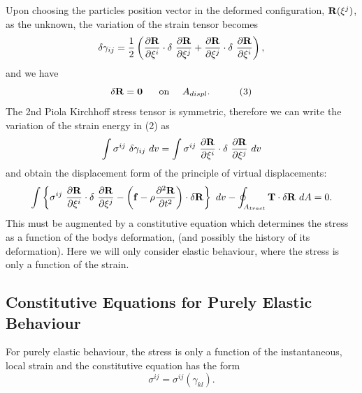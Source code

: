Upon choosing the particles\textquotesingle{} position vector in the deformed configuration, ${\bf R}(\xi^j)$, as the unknown, the variation of the strain tensor becomes \[ \delta \gamma_{ij} = \frac{1}{2} \left( \frac{\partial {\bf R}}{\partial \xi^i} \cdot \delta \ \frac{\partial {\bf R}}{\partial \xi^j} + \frac{\partial {\bf R}}{\partial \xi^j} \cdot \delta \ \frac{\partial {\bf R}}{\partial \xi^i} \right), \] and we have \[ \delta {\bf R} = {\bf 0} \mbox{ \ \ \ \ on \ \ \ $ A_{displ}.$ } \ \ \ \ \ \ \ \ (3) \] The 2nd Piola Kirchhoff stress tensor is symmetric, therefore we can write the variation of the strain energy in (2) as \[ \int \sigma^{ij} \ \delta \gamma_{ij} \ dv = \int \sigma^{ij} \ \frac{\partial {\bf R}}{\partial \xi^i} \cdot \delta \ \frac{\partial {\bf R}}{\partial \xi^j} \ dv \] and obtain the displacement form of the principle of virtual displacements\+: \[ \int \left\{ \sigma^{ij} \ \frac{\partial {\bf R}}{\partial \xi^i} \cdot \delta \ \frac{\partial {\bf R}}{\partial \xi^j} - \left( {\bf f} - \rho \frac{\partial^2 {\bf R}}{\partial t^2} \right) \cdot \delta {\bf R} \right\} \ dv - \oint_{A_{tract}} {\bf T} \cdot \delta {\bf R} \ dA =0. \] This must be augmented by a constitutive equation which determines the stress as a function of the body\textquotesingle{}s deformation, (and possibly the history of its deformation). Here we will only consider elastic behaviour, where the stress is only a function of the strain.



\hypertarget{index_elastic_constitutive}{}\subsection{Constitutive Equations for Purely Elastic Behaviour}\label{index_elastic_constitutive}
For purely elastic behaviour, the stress is only a function of the instantaneous, local strain and the constitutive equation has the form \[ \sigma^{ij} = \sigma^{ij} (\gamma_{kl}). \]

